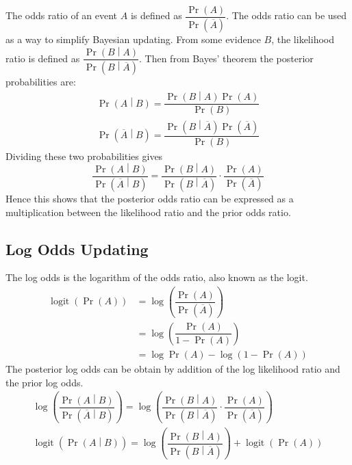 \documentclass[11pt]{report} %
\begin{document}
The odds ratio of an event $A$ is defined as $\dfrac{\operatorname{Pr}\left(A\right)}{\operatorname{Pr}\left(\overline{A}\right)}$. The odds ratio can be used as a way to simplify Bayesian updating. From some evidence $B$, the likelihood ratio is defined as $\dfrac{\operatorname{Pr}\left(B\middle|A\right)}{\operatorname{Pr}\left(B\middle|\overline{A}\right)}$. Then from Bayes' theorem the posterior probabilities are:
\begin{gather}
\operatorname{Pr}\left(A\middle|B\right) = \dfrac{\operatorname{Pr}\left(B\middle|A\right)\operatorname{Pr}\left(A\right)}{\operatorname{Pr}\left(B\right)} \\
\operatorname{Pr}\left(\overline{A}\middle|B\right) = \dfrac{\operatorname{Pr}\left(B\middle|\overline{A}\right)\operatorname{Pr}\left(\overline{A}\right)}{\operatorname{Pr}\left(B\right)}
\end{gather}
Dividing these two probabilities gives
\begin{equation}
\dfrac{\operatorname{Pr}\left(A\middle|B\right)}{\operatorname{Pr}\left(\overline{A}\middle|B\right)} = \dfrac{\operatorname{Pr}\left(B\middle|A\right)}{\operatorname{Pr}\left(B\middle|\overline{A}\right)}\cdot\dfrac{\operatorname{Pr}\left(A\right)}{\operatorname{Pr}\left(\overline{A}\right)}
\end{equation}
Hence this shows that the posterior odds ratio can be expressed as a multiplication between the likelihood ratio and the prior odds ratio.

\subsection{Log Odds Updating}

The log odds is the logarithm of the odds ratio, also known as the logit.
\begin{align}
\operatorname{logit}\left(\operatorname{Pr}\left(A\right)\right) &= \log\left(\dfrac{\operatorname{Pr}\left(A\right)}{\operatorname{Pr}\left(\overline{A}\right)}\right) \\
&= \log\left(\dfrac{\operatorname{Pr}\left(A\right)}{1 - \operatorname{Pr}\left(A\right)}\right) \\
&= \log\operatorname{Pr}\left(A\right) - \log\left(1 - \operatorname{Pr}\left(A\right)\right)
\end{align}
The posterior log odds can be obtain by addition of the log likelihood ratio and the prior log odds.
\begin{gather}
\log\left(\dfrac{\operatorname{Pr}\left(A\middle|B\right)}{\operatorname{Pr}\left(\overline{A}\middle|B\right)}\right) = \log\left(\dfrac{\operatorname{Pr}\left(B\middle|A\right)}{\operatorname{Pr}\left(B\middle|\overline{A}\right)}\cdot\dfrac{\operatorname{Pr}\left(A\right)}{\operatorname{Pr}\left(\overline{A}\right)}\right) \\
\operatorname{logit}\left(\operatorname{Pr}\left(A\middle|B\right)\right) = \log\left(\dfrac{\operatorname{Pr}\left(B\middle|A\right)}{\operatorname{Pr}\left(B\middle|\overline{A}\right)}\right) + \operatorname{logit}\left(\operatorname{Pr}\left(A\right)\right)
\end{gather}
\end{document}
